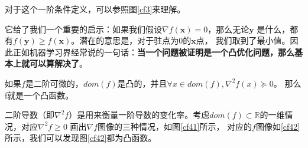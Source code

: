 \documentclass[lang=cn,10pt]{elegantbook}
\newcommand\bv[1]{\boldsymbol{#1}}
\newcommand\mb[1]{\mathbb{#1}}
\begin{document}
对于这个一阶条件定义，可以参照图\ref{cf3}来理解。

它给了我们一个重要的启示：如果我们假设$\nabla f(\bv{x})=0$，那么无论$\bv{y}$
是什么，都有$f(\bv{y}) \geq f(\bv{x})$。潜在的意思是，对于驻点为$0$的$\bv{x}$点，
我们取到了最小值。因此正如机器学习界经常说的一句话：\textbf{当一个问题被证明是一个凸优化问题，那么基本上就可以算解决了}。

\begin{definition}
	如果$f$是二阶可微的，$dom(f)$是凸的，并且$\forall x \in dom(f),\nabla^2f(x)\succeq 0$。
	那么f就是一个凸函数。
\end{definition}
二阶导数（即$\nabla^2 f$）是用来衡量一阶导数的变化率。考虑$dom(f) \subset \mb{R}$的一维情况，对应$\nabla^2 f \geq 0$
画出$\nabla f$图像的三种情况，如图\ref{cf41}所示，
对应的$f$图像如\ref{cf42}所示，我们可以发现图\ref{cf42}都为凸函数。
\end{document}
